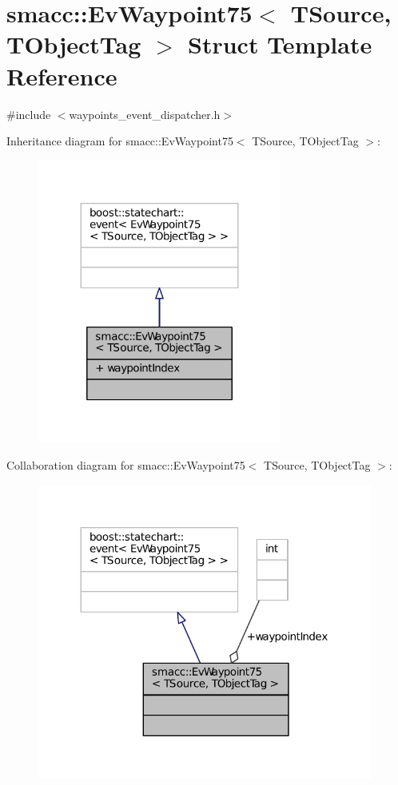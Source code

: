 \hypertarget{structsmacc_1_1EvWaypoint75}{}\section{smacc\+:\+:Ev\+Waypoint75$<$ T\+Source, T\+Object\+Tag $>$ Struct Template Reference}
\label{structsmacc_1_1EvWaypoint75}


{\ttfamily \#include $<$waypoints\+\_\+event\+\_\+dispatcher.\+h$>$}



Inheritance diagram for smacc\+:\+:Ev\+Waypoint75$<$ T\+Source, T\+Object\+Tag $>$\+:
\nopagebreak
\begin{figure}[H]
\begin{center}
\leavevmode
\includegraphics[width=227pt]{structsmacc_1_1EvWaypoint75__inherit__graph}
\end{center}
\end{figure}


Collaboration diagram for smacc\+:\+:Ev\+Waypoint75$<$ T\+Source, T\+Object\+Tag $>$\+:
\nopagebreak
\begin{figure}[H]
\begin{center}
\leavevmode
\includegraphics[width=312pt]{structsmacc_1_1EvWaypoint75__coll__graph}
\end{center}
\end{figure}
